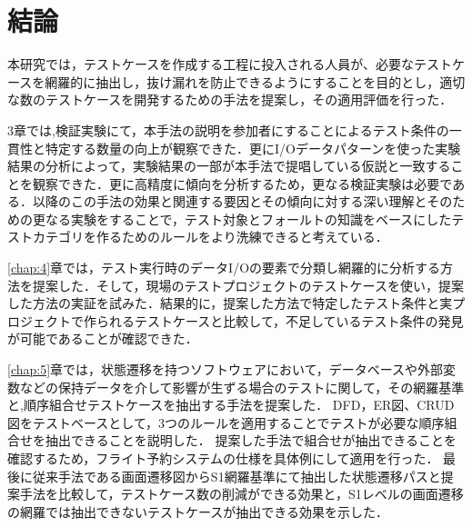 \chapter{結論}

本研究では，テストケースを作成する工程に投入される人員が、必要なテストケースを網羅的に抽出し，抜け漏れを防止できるようにすることを目的とし，適切な数のテストケースを開発するための手法を提案し，その適用評価を行った．

3章では,検証実験にて，本手法の説明を参加者にすることによるテスト条件の一貫性と特定する数量の向上が観察できた．更にI/Oデータパターンを使った実験結果の分析によって，実験結果の一部が本手法で提唱している仮説と一致することを観察できた．更に高精度に傾向を分析するため，更なる検証実験は必要である．以降のこの手法の効果と関連する要因とその傾向に対する深い理解とそのための更なる実験をすることで，テスト対象とフォールトの知識をベースにしたテストカテゴリを作るためのルールをより洗練できると考えている．


\ref{chap:4}章では，テスト実行時のデータI/Oの要素で分類し網羅的に分析する方法を提案した．そして，現場のテストプロジェクトのテストケースを使い，提案した方法の実証を試みた．結果的に，提案した方法で特定したテスト条件と実プロジェクトで作られるテストケースと比較して，不足しているテスト条件の発見が可能であることが確認できた．

\ref{chap:5}章では，状態遷移を持つソフトウェアにおいて，データベースや外部変数などの保持データを介して影響が生ずる場合のテストに関して，その網羅基準と,順序組合せテストケースを抽出する手法を提案した．
DFD，ER図、CRUD図をテストベースとして，3つのルールを適用することでテストが必要な順序組合せを抽出できることを説明した．
提案した手法で組合せが抽出できることを確認するため，フライト予約システムの仕様を具体例にして適用を行った．
最後に従来手法である画面遷移図からS1網羅基準にて抽出した状態遷移パスと提案手法を比較して，テストケース数の削減ができる効果と，S1レベルの画面遷移の網羅では抽出できないテストケースが抽出できる効果を示した．

